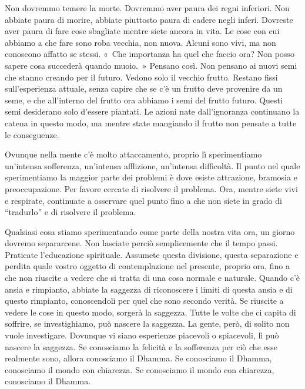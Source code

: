 Non dovremmo temere la morte. Dovremmo aver paura dei regni inferiori.
Non abbiate paura di morire, abbiate piuttosto paura di cadere negli
inferi. Dovreste aver paura di fare cose sbagliate mentre siete ancora
in vita. Le cose con cui abbiamo a che fare sono roba vecchia, non
nuova. Alcuni sono vivi, ma non conoscono affatto se stessi. «~Che
importanza ha quel che faccio ora? Non posso sapere cosa succederà
quando muoio.~» Pensano così. Non pensano ai nuovi semi che stanno
creando per il futuro. Vedono solo il vecchio frutto. Restano fissi
sull'esperienza attuale, senza capire che se c'è un frutto deve
provenire da un seme, e che all'interno del frutto ora abbiamo i semi
del frutto futuro. Questi semi desiderano solo d'essere piantati. Le
azioni nate dall'ignoranza continuano la catena in questo modo, ma
mentre state mangiando il frutto non pensate a tutte le conseguenze.

Ovunque nella mente c'è molto attaccamento, proprio lì sperimentiamo
un'intensa sofferenza, un'intensa afflizione, un'intensa difficoltà. Il
punto nel quale sperimentiamo la maggior parte dei problemi è dove
esiste attrazione, bramosia e preoccupazione. Per favore cercate di
risolvere il problema. Ora, mentre siete vivi e respirate, continuate a
osservare quel punto fino a che non siete in grado di ``tradurlo'' e di
risolvere il problema.

Qualsiasi cosa stiamo sperimentando come parte della nostra vita ora, un
giorno dovremo separarcene. Non lasciate perciò semplicemente che il
tempo passi. Praticate l'educazione spirituale. Assumete questa
divisione, questa separazione e perdita quale vostro oggetto di
contemplazione nel presente, proprio ora, fino a che non riuscite a
vedere che si tratta di una cosa normale e naturale. Quando c'è ansia e
rimpianto, abbiate la saggezza di riconoscere i limiti di questa ansia e
di questo rimpianto, conoscendoli per quel che sono secondo verità. Se
riuscite a vedere le cose in questo modo, sorgerà la saggezza. Tutte le
volte che ci capita di soffrire, se investighiamo, può nascere la
saggezza. La gente, però, di solito non vuole investigare. Dovunque vi
siano esperienze piacevoli o spiacevoli, lì può nascere la \mbox{saggezza}. Se
conosciamo la felicità e la sofferenza per ciò che esse realmente sono,
allora conosciamo il Dhamma. Se conosciamo il Dhamma, conosciamo il
mondo con chiarezza. Se conosciamo il mondo con chiarezza, conosciamo il
Dhamma.


